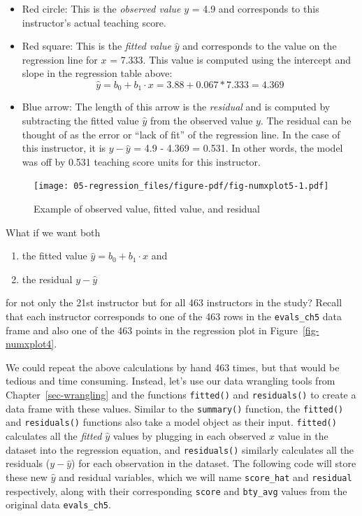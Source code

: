 \documentclass[
  letterpaper,
  DIV=11,
  numbers=noendperiod]{scrreprt}
\providecommand{\tightlist}{%
  \setlength{\itemsep}{0pt}\setlength{\parskip}{0pt}}\usepackage{longtable,booktabs,array}
\theoremstyle{definition}
\theoremstyle{remark}
\begin{document}
\begin{itemize}
\item
  Red circle: This is the \emph{observed value} \(y\) = 4.9 and
  corresponds to this instructor's actual teaching score.
\item
  Red square: This is the \emph{fitted value} \(\widehat{y}\) and
  corresponds to the value on the regression line for \(x\) = 7.333.
  This value is computed using the intercept and slope in the regression
  table above:
  \[\widehat{y} = b_0 + b_1 \cdot x = 3.88 + 0.067 * 7.333 = 4.369\]
\item
  Blue arrow: The length of this arrow is the \emph{residual} and is
  computed by subtracting the fitted value \(\widehat{y}\) from the
  observed value \(y\). The residual can be thought of as the error or
  ``lack of fit'' of the regression line. In the case of this
  instructor, it is \(y - \widehat{y}\) = 4.9 - 4.369 = 0.531. In other
  words, the model was off by 0.531 teaching score units for this
  instructor.
\end{itemize}

\begin{figure}

{\centering \texttt{[image: 05-regression\_files/figure-pdf/fig-numxplot5-1.pdf]}

}

\caption{\label{fig-numxplot5}Example of observed value, fitted value,
and residual}

\end{figure}

What if we want both

\begin{enumerate}
\def\labelenumi{\arabic{enumi}.}
\tightlist
\item
  the fitted value \(\widehat{y} = b_0 + b_1 \cdot x\) and
\item
  the residual \(y - \widehat{y}\)
\end{enumerate}

for not only the 21st instructor but for all 463 instructors in the
study? Recall that each instructor corresponds to one of the 463 rows in
the \texttt{evals\_ch5} data frame and also one of the 463 points in the
regression plot in Figure~\ref{fig-numxplot4}.

We could repeat the above calculations by hand 463 times, but that would
be tedious and time consuming. Instead, let's use our data wrangling
tools from Chapter~\ref{sec-wrangling} and the functions
\texttt{fitted()} and \texttt{residuals()} to create a data frame with
these values. Similar to the \texttt{summary()} function, the
\texttt{fitted()} and \texttt{residuals()} functions also take a model
object as their input. \texttt{fitted()} calculates all the
\emph{fitted} \(\hat{y}\) values by plugging in each observed \(x\)
value in the dataset into the regression equation, and
\texttt{residuals()} similarly calculates all the residuals
(\(y - \hat{y}\)) for each observation in the dataset. The following
code will store these new \(\hat{y}\) and residual variables, which we
will name \texttt{score\_hat} and \texttt{residual} respectively, along
with their corresponding \texttt{score} and \texttt{bty\_avg} values
from the original data \texttt{evals\_ch5}.
\end{document}
